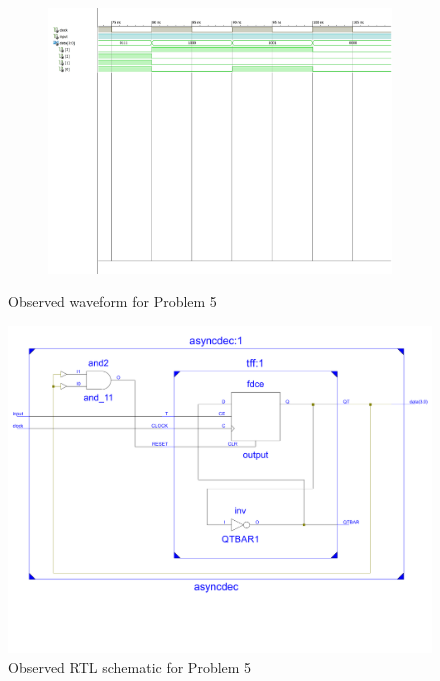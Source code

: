 \documentclass{lab_sheet}
\begin{document}
\begin{figure}[H]
        \begin{subfigure}{\linewidth}
            \includegraphics[width=.95\linewidth, frame]{../Figures/5-3.pdf}
        \caption{}
        \label{fig:obs5-3}
        \end{subfigure}
        \caption{Observed waveform for Problem 5}
        \label{fig:obs5}
    \end{figure}
    \begin{figure}[H]
        \centering
        \includegraphics[scale=0.5]{../Figures/q5_ckt.pdf}
        \caption{Observed RTL schematic for Problem 5}
        \label{fig:rtl5}
    \end{figure}
\end{document}
